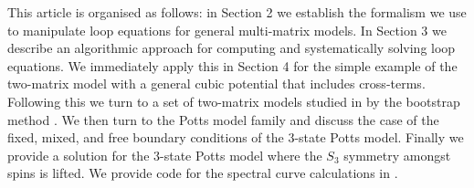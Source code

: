 This article is organised as follows: in Section 2 we establish the formalism we use to manipulate
loop equations for general multi-matrix models. In Section 3 we describe an algorithmic approach
for computing and systematically solving loop equations. We immediately apply this in Section 4 for
the simple example of the two-matrix model with a general cubic potential that includes
cross-terms. Following this we turn to a set of two-matrix models studied in
\cite{khalkhali2025bootstrappingcriticalbehaviormultimatrix} by the bootstrap method
\cite{Lin_2020}. We then turn to the Potts model family and discuss the case of the fixed, mixed,
and free boundary conditions of the 3-state Potts model. Finally we provide a solution for the 3-state Potts model where the $S_3$
symmetry amongst spins is lifted. We provide code for the spectral curve calculations in \cite{Kulanthaivelu:LoopEquationsCode}.
